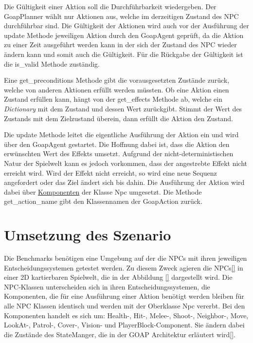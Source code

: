 Die Gültigkeit einer Aktion soll die Durchführbarkeit wiedergeben. Der GoapPlanner wählt nur Aktionen aus, welche im derzeitigen Zustand des NPC durchführbar sind. Die Gültigkeit der Aktionen wird auch vor der Ausführung der update Methode jeweiligen Aktion durch den GoapAgent geprüft, da die Aktion zu einer Zeit ausgeführt werden kann in der sich der Zustand des NPC wieder ändern kann und somit auch die Gültigkeit. Für die Rückgabe der Gültigkeit ist die is\_valid Methode zuständig.

Eine get\_preconditions Methode gibt die vorausgesetzten Zustände zurück, welche von anderen Aktionen erfüllt werden müssten. Ob eine Aktion einen Zustand erfüllen kann, hängt von der get\_effects Methode ab, welche ein \textit{Dictionary} mit dem Zustand und dessen Wert zurückgibt. Stimmt der Wert des Zustands mit dem Zielzustand überein, dann erfüllt die Aktion den Zustand.

Die update Methode leitet die eigentliche Ausführung der Aktion ein und wird über den GoapAgent gestartet. Die Hoffnung dabei ist, dass die Aktion den erwünschten Wert des Effekts umsetzt. Aufgrund der nicht-deterministischen Natur der Spielwelt kann es jedoch vorkommen, dass der angestrebte Effekt nicht erreicht wird. Wird der Effekt nicht erreicht, so wird eine neue Sequenz angefordert oder das Ziel ändert sich bis dahin. Die Ausführung der Aktion wird dabei über \hyperref[chap:game-objects]{Komponenten} der Klasse Npc umgesetzt. Die Methode get\_action\_name gibt den Klassennamen der GoapAction zurück.


\section{Umsetzung des Szenario}
\label{chap:implementierung szenario}

Die Benchmarks benötigen eine Umgebung auf der die NPCs mit ihren jeweiligen Entscheidungssystemen getestet werden. Zu diesem Zweck agieren die NPCs\ref{} in einer 2D kartierbaren Spielwelt, die in der Abbildung \ref{} dargestellt wird. Die NPC-Klassen unterscheiden sich in ihren Entscheidungssystemen, die Komponenten, die für eine Ausführung einer Aktion benötigt werden bleiben für alle NPC Klassen identisch und werden mit der Oberklasse Npc vererbt. Bei den Komponenten handelt es sich um: Health-, Hit-, Melee-, Shoot-, Neighbor-, Move, LookAt-, Patrol-, Cover-, Vision- und PlayerBlock-Component. Sie ändern dabei die Zustände des StateManger, die in der GOAP Architektur erläutert wird\ref{}.

